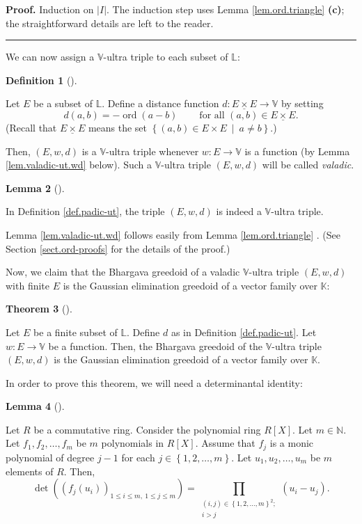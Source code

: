 \documentclass[numbers=enddot,12pt,final,onecolumn,notitlepage]{scrartcl}%
\theoremstyle{definition}
\newtheorem{theo}{Theorem}[section]
\newenvironment{theorem}[1][]
{\begin{theo}[#1]\begin{leftbar}}
{\end{leftbar}\end{theo}}
\newtheorem{lem}[theo]{Lemma}
\newenvironment{lemma}[1][]
{\begin{lem}[#1]\begin{leftbar}}
{\end{leftbar}\end{lem}}
\newtheorem{defi}[theo]{Definition}
\newenvironment{definition}[1][]
{\begin{defi}[#1]\begin{leftbar}}
{\end{leftbar}\end{defi}}
\newenvironment{proof}[1][Proof]{\noindent\textbf{#1.} }{\ \rule{0.5em}{0.5em}}
\let\prodnonlimits\prod
\renewcommand{\prod}{\prodnonlimits\limits}
\newcommand{\timesu}{\mathbin{\underline{\times}}}
\renewcommand{\leq}{\leqslant}
\theoremstyle{plainsl}
\begin{document}
\begin{proof}
Induction on $\left\vert I\right\vert $. The induction step uses Lemma
\ref{lem.ord.triangle} \textbf{(c)}; the straightforward details are left to
the reader.
\end{proof}

We can now assign a $\mathbb{V}$-ultra triple to each subset of $\mathbb{L}$:

\begin{definition}
\label{def.padic-ut}Let $E$ be a subset of $\mathbb{L}$. Define a distance
function $d:E\timesu E\rightarrow\mathbb{V}$ by setting%
\[
d\left(  a,b\right)  =-\operatorname*{ord}\left(  a-b\right)
\ \ \ \ \ \ \ \ \ \ \text{for all }\left(  a,b\right)  \in E\timesu E.
\]
(Recall that $E\timesu E$ means the set $\left\{  \left(  a,b\right)  \in
E\times E\ \mid\ a\neq b\right\}  $.)

Then, $\left(  E,w,d\right)  $ is a $\mathbb{V}$-ultra triple whenever
$w:E\rightarrow\mathbb{V}$ is a function (by Lemma \ref{lem.valadic-ut.wd}
below). Such a $\mathbb{V}$-ultra triple $\left(  E,w,d\right)  $ will be
called \textit{valadic}.
\end{definition}

\begin{lemma}
\label{lem.valadic-ut.wd}In Definition \ref{def.padic-ut}, the triple $\left(
E,w,d\right)  $ is indeed a $\mathbb{V}$-ultra triple.
\end{lemma}

Lemma \ref{lem.valadic-ut.wd} follows easily from Lemma \ref{lem.ord.triangle}%
. (See Section \ref{sect.ord-proofs} for the details of the proof.)

Now, we claim that the Bhargava greedoid of a valadic $\mathbb{V}$-ultra
triple $\left(  E,w,d\right)  $ with finite $E$ is the Gaussian elimination
greedoid of a vector family over $\mathbb{K}$:

\begin{theorem}
\label{thm.poly-ut-greed}Let $E$ be a finite subset of $\mathbb{L}$. Define
$d$ as in Definition \ref{def.padic-ut}. Let $w:E\rightarrow\mathbb{V}$ be a
function. Then, the Bhargava greedoid of the $\mathbb{V}$-ultra triple
$\left(  E,w,d\right)  $ is the Gaussian elimination greedoid of a vector
family over $\mathbb{K}$.
\end{theorem}

In order to prove this theorem, we will need a determinantal identity:

\begin{lemma}
\label{lem.vandermonde.monic}Let $R$ be a commutative ring. Consider the
polynomial ring $R\left[  X\right]  $. Let $m\in\mathbb{N}$. Let $f_{1}%
,f_{2},\ldots,f_{m}$ be $m$ polynomials in $R\left[  X\right]  $. Assume that
$f_{j}$ is a monic polynomial of degree $j-1$ for each $j\in\left\{
1,2,\ldots,m\right\}  $. Let $u_{1},u_{2},\ldots,u_{m}$ be $m$ elements of
$R$. Then,%
\[
\det\left(  \left(  f_{j}\left(  u_{i}\right)  \right)  _{1\leq i\leq
m,\ 1\leq j\leq m}\right)  =\prod_{\substack{\left(  i,j\right)  \in\left\{
1,2,\ldots,m\right\}  ^{2};\\i>j}}\left(  u_{i}-u_{j}\right)  .
\]

\end{lemma}
\end{document}
